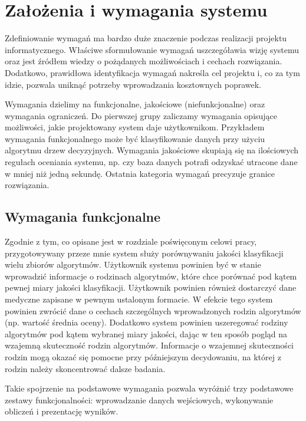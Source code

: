 \documentclass[../thesis.tex]{subfiles}
\begin{document}
\pagestyle{plain}

\chapter{Założenia i wymagania systemu}

Zdefiniowanie wymagań ma bardzo duże znaczenie podczas realizacji projektu informatycznego. Właściwe sformułowanie wymagań uszczegóławia wizję systemu oraz jest źródłem wiedzy o pożądanych możliwościach i cechach rozwiązania. Dodatkowo, prawidłowa identyfikacja wymagań nakreśla cel projektu i, co za tym idzie, pozwala uniknąć potrzeby wprowadzania kosztownych poprawek.

Wymagania dzielimy na funkcjonalne, jakościowe (niefunkcjonalne) oraz wymagania ograniczeń. Do pierwszej grupy zaliczamy wymagania opisujące możliwości, jakie projektowany system daje użytkownikom. Przykładem wymagania funkcjonalnego może być klasyfikowanie danych przy użyciu algorytmu drzew decyzyjnych. Wymagania jakościowe skupiają się na ilościowych regułach oceniania systemu, np. czy baza danych potrafi odzyskać utracone dane w mniej niż jedną sekundę. Ostatnia kategoria wymagań precyzuje granice rozwiązania. 

\section{Wymagania funkcjonalne}

Zgodnie z tym, co opisane jest w rozdziale poświęconym celowi pracy, przygotowywany przeze mnie system służy porównywaniu jakości klasyfikacji wielu zbiorów algorytmów. Użytkownik systemu powinien być w stanie wprowadzić informacje o rodzinach algorytmów, które chce porównać pod kątem pewnej miary jakości klasyfikacji. Użytkownik powinien również dostarczyć dane medyczne zapisane w pewnym ustalonym formacie. W efekcie tego system powinien zwrócić dane o cechach szczególnych wprowadzonych rodzin algorytmów (np. wartość średnia oceny). Dodatkowo system powinien uszeregować rodziny algorytmów pod kątem wybranej miary jakości, dając w ten sposób pogląd na wzajemną skuteczność rodzin algorytmów. Informacje o wzajemnej skuteczności rodzin mogą okazać się pomocne przy późniejszym decydowaniu, na której z rodzin należy skoncentrować dalsze badania.

Takie spojrzenie na podstawowe wymagania pozwala wyróżnić trzy podstawowe zestawy funkcjonalności: wprowadzanie danych wejściowych, wykonywanie obliczeń i prezentację wyników.
\end{document}
